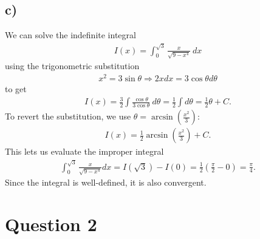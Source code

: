 \documentclass{article}
\begin{document}
\subsection*{c)}
We can solve the indefinite integral
\begin{align*}
  I(x)=\int_0^{\sqrt{3}}\frac{x}{\sqrt{9-x^4}}\:dx
\end{align*}
using the trigonometric substitution
\begin{align*}
  x^2 = 3\sin\theta \Rightarrow 2xdx = 3\cos \theta d\theta
\end{align*}
to get
\begin{align*}
  I(x)=\frac{3}{2}\int \frac{\cos\theta}{3\cos\theta}\:d\theta = \frac{1}{2}\int d\theta = \frac{1}{2}\theta + C.
\end{align*}
To revert the substitution, we use $\theta = \arcsin\left(\frac{x^2}{3}\right)$:
\begin{align*}
  I(x)=\frac{1}{2}\arcsin\left(\frac{x^2}{3}\right)+C.
\end{align*}
This lets us evaluate the improper integral
\begin{align*}
  \int_0^{\sqrt{3}}\frac{x}{\sqrt{9-x^4}}dx = I(\sqrt{3})-I(0)=\frac{1}{2}\left(\frac{\pi}{2}-0\right)=\frac{\pi}{4}.
\end{align*}
Since the integral is well-defined, it is also convergent.
\section*{Question 2}
\end{document}
